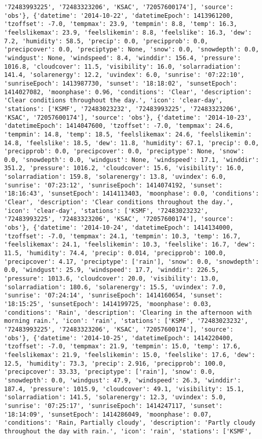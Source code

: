 \documentclass[
  letterpaper,
  DIV=11,
  numbers=noendperiod]{scrartcl}
\begin{document}
\begin{verbatim}
'72483993225', '72483323206', 'KSAC', '72057600174'], 'source': 'obs'}, {'datetime': '2014-10-22', 'datetimeEpoch': 1413961200, 'tzoffset': -7.0, 'tempmax': 23.9, 'tempmin': 8.8, 'temp': 16.3, 'feelslikemax': 23.9, 'feelslikemin': 8.8, 'feelslike': 16.3, 'dew': 7.2, 'humidity': 58.5, 'precip': 0.0, 'precipprob': 0.0, 'precipcover': 0.0, 'preciptype': None, 'snow': 0.0, 'snowdepth': 0.0, 'windgust': None, 'windspeed': 8.4, 'winddir': 156.4, 'pressure': 1016.8, 'cloudcover': 11.5, 'visibility': 16.0, 'solarradiation': 141.4, 'solarenergy': 12.2, 'uvindex': 6.0, 'sunrise': '07:22:10', 'sunriseEpoch': 1413987730, 'sunset': '18:18:02', 'sunsetEpoch': 1414027082, 'moonphase': 0.96, 'conditions': 'Clear', 'description': 'Clear conditions throughout the day.', 'icon': 'clear-day', 'stations': ['KSMF', '72483023232', '72483993225', '72483323206', 'KSAC', '72057600174'], 'source': 'obs'}, {'datetime': '2014-10-23', 'datetimeEpoch': 1414047600, 'tzoffset': -7.0, 'tempmax': 24.6, 'tempmin': 14.8, 'temp': 18.5, 'feelslikemax': 24.6, 'feelslikemin': 14.8, 'feelslike': 18.5, 'dew': 11.8, 'humidity': 67.1, 'precip': 0.0, 'precipprob': 0.0, 'precipcover': 0.0, 'preciptype': None, 'snow': 0.0, 'snowdepth': 0.0, 'windgust': None, 'windspeed': 17.1, 'winddir': 351.2, 'pressure': 1016.2, 'cloudcover': 15.6, 'visibility': 16.0, 'solarradiation': 159.8, 'solarenergy': 13.8, 'uvindex': 6.0, 'sunrise': '07:23:12', 'sunriseEpoch': 1414074192, 'sunset': '18:16:43', 'sunsetEpoch': 1414113403, 'moonphase': 0.0, 'conditions': 'Clear', 'description': 'Clear conditions throughout the day.', 'icon': 'clear-day', 'stations': ['KSMF', '72483023232', '72483993225', '72483323206', 'KSAC', '72057600174'], 'source': 'obs'}, {'datetime': '2014-10-24', 'datetimeEpoch': 1414134000, 'tzoffset': -7.0, 'tempmax': 24.1, 'tempmin': 10.3, 'temp': 16.7, 'feelslikemax': 24.1, 'feelslikemin': 10.3, 'feelslike': 16.7, 'dew': 11.5, 'humidity': 74.4, 'precip': 0.014, 'precipprob': 100.0, 'precipcover': 4.17, 'preciptype': ['rain'], 'snow': 0.0, 'snowdepth': 0.0, 'windgust': 25.9, 'windspeed': 17.7, 'winddir': 226.5, 'pressure': 1013.6, 'cloudcover': 20.0, 'visibility': 13.0, 'solarradiation': 180.6, 'solarenergy': 15.5, 'uvindex': 7.0, 'sunrise': '07:24:14', 'sunriseEpoch': 1414160654, 'sunset': '18:15:25', 'sunsetEpoch': 1414199725, 'moonphase': 0.03, 'conditions': 'Rain', 'description': 'Clearing in the afternoon with morning rain.', 'icon': 'rain', 'stations': ['KSMF', '72483023232', '72483993225', '72483323206', 'KSAC', '72057600174'], 'source': 'obs'}, {'datetime': '2014-10-25', 'datetimeEpoch': 1414220400, 'tzoffset': -7.0, 'tempmax': 21.9, 'tempmin': 15.0, 'temp': 17.6, 'feelslikemax': 21.9, 'feelslikemin': 15.0, 'feelslike': 17.6, 'dew': 12.5, 'humidity': 73.3, 'precip': 2.916, 'precipprob': 100.0, 'precipcover': 33.33, 'preciptype': ['rain'], 'snow': 0.0, 'snowdepth': 0.0, 'windgust': 47.9, 'windspeed': 26.3, 'winddir': 187.4, 'pressure': 1015.9, 'cloudcover': 49.1, 'visibility': 15.1, 'solarradiation': 141.5, 'solarenergy': 12.3, 'uvindex': 5.0, 'sunrise': '07:25:17', 'sunriseEpoch': 1414247117, 'sunset': '18:14:09', 'sunsetEpoch': 1414286049, 'moonphase': 0.07, 'conditions': 'Rain, Partially cloudy', 'description': 'Partly cloudy throughout the day with rain.', 'icon': 'rain', 'stations': ['KSMF', 
\end{verbatim}
\end{document}
